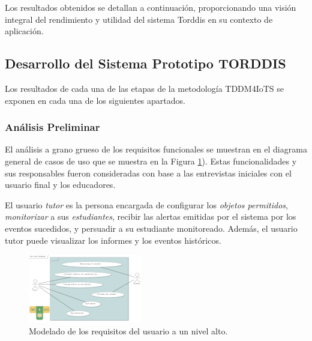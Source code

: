\documentclass[a4paper,fleqn]{cas-sc}
\begin{document}
		Los resultados obtenidos se detallan a continuación, proporcionando una visión integral del rendimiento y utilidad del sistema Torddis en su contexto de aplicación.
		
		\subsection{Desarrollo del Sistema Prototipo TORDDIS}
			Los resultados de cada una de las etapas de la metodología TDDM4IoTS \cite{Guerrero-Ulloa2020TDDM4IoTS} se exponen en cada una de los siguientes apartados.
			
			\subsubsection{Análisis Preliminar}
				El análisis a grano grueso de los requisitos funcionales se muestran en el diagrama general de casos de uso que se muestra en la Figura \ref{fig:UseCaseDiagram}). Estas funcionalidades y sus responsables fueron consideradas con base a las entrevistas iniciales con el usuario final y los educadores.
				
				El usuario \textit{tutor} es la persona encargada de configurar los \textit{objetos permitidos}, \textit{monitorizar} a sus \textit{estudiantes}, recibir las alertas emitidas por el sistema por los eventos sucedidos, y persuadir a su estudiante monitoreado. Además, el usuario tutor puede visualizar los informes y los eventos históricos.
				
				\begin{figure}[h]
					\centering
					\includegraphics[frame,scale=0.5, width=\linewidth]{figs/Figure_2}
					\caption{Modelado de los requisitos del usuario a un nivel alto.\label{fig:UseCaseDiagram}}
				\end{figure} 
				
\end{document}
